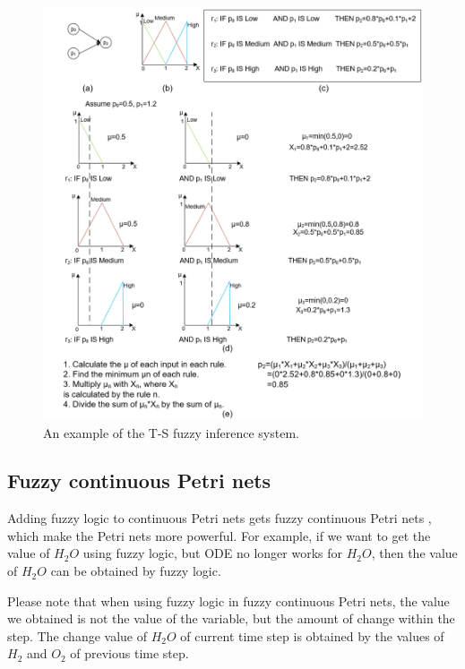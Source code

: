 \documentclass[journal,a4paper,onecolumn]{article}
\begin{document}
\begin{figure}[!hbt]
	\begin{center}
		\includegraphics[width=\columnwidth]{fuzzy_logic_example1}
		\caption{An example of the T-S fuzzy inference system.}
		\label{fig:example-T-S}
	\end{center}
\end{figure}



\subsection{Fuzzy continuous Petri nets}
Adding fuzzy logic to continuous Petri nets gets fuzzy continuous Petri nets \cite{LHG18}, which make the Petri nets more powerful. For example, if we want to get the value of $H_2O$ using fuzzy logic, but ODE no longer works for $H_2O$, then the value of $H_2O$ can be obtained by fuzzy logic. 

Please note that when using fuzzy logic in fuzzy continuous Petri nets, the value we obtained is not the value of the variable, but the amount of change within the step. The change value of $H_2O$ of current time step is obtained by the values of $H_2$ and $O_2$ of previous time step. 
\end{document}
